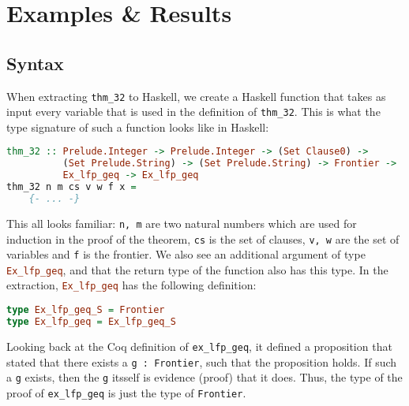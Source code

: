 \chapter{Examples \& Results}

\section{Syntax}

When extracting \lstinline{thm_32} to Haskell, we
create a Haskell function that takes as input every variable
that is used in the definition of \lstinline{thm_32}.
This is what the type signature of such a function looks like in Haskell:

\begin{minipage}{\linewidth}
\begin{lstlisting}[language=Haskell, label={lst:thm_32_haskell}, caption={Haskell extraction of \lstinline{thm_32}}]
thm_32 :: Prelude.Integer -> Prelude.Integer -> (Set Clause0) ->
          (Set Prelude.String) -> (Set Prelude.String) -> Frontier ->
          Ex_lfp_geq -> Ex_lfp_geq
thm_32 n m cs v w f x =
    {- ... -}
\end{lstlisting}
\end{minipage}

This all looks familiar: \lstinline{n, m} are two natural numbers which are used for induction in the proof of the theorem,
\lstinline{cs} is the set of clauses, \lstinline{v, w} are the set of variables
and \lstinline{f} is the frontier.
We also see an additional argument of type \lstinline[language=Haskell]{Ex_lfp_geq}, and that the return type
of the function also has this type.
In the extraction, \lstinline[language=Haskell]{Ex_lfp_geq} has the following definition:

\begin{minipage}{\linewidth}
\begin{lstlisting}[language=Haskell, label={lst:ex_lfp_geq_haskell}, caption={\lstinline{Ex_lfp_geq} in Haskell}]
type Ex_lfp_geq_S = Frontier
type Ex_lfp_geq = Ex_lfp_geq_S
\end{lstlisting}
\end{minipage}

Looking back at the Coq definition of \lstinline{ex_lfp_geq}, it defined a proposition that stated that there
exists a \lstinline{g : Frontier}, such that the proposition holds.
If such a \lstinline{g} exists, then the \lstinline{g} itsself is evidence (proof) that it does.
Thus, the type of the proof of \lstinline{ex_lfp_geq} is just the type of \lstinline{Frontier}.

